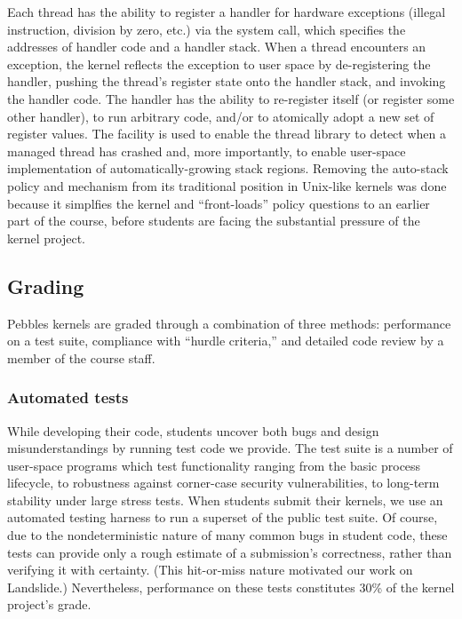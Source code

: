 Each thread has the ability to register a handler
for hardware exceptions (illegal instruction,
division by zero, etc.)
via the  system call,
which specifies the addresses of handler code
and a handler stack.
When a thread encounters an exception,
the kernel reflects the exception to user space
by
de-registering the handler,
pushing the thread's register state onto the handler stack,
and invoking the handler code.
The handler has the ability to re-register itself
(or register some other handler),
to run arbitrary code,
and/or to atomically adopt a new set of register
values.
The  facility is used to enable
the thread library to detect when a managed
thread has crashed
and, more importantly,
to enable user-space
implementation of automatically-growing stack
regions.
Removing the auto-stack policy and mechanism from
its traditional position in Unix-like kernels
was done because it simplfies the kernel and
``front-loads'' policy questions to an earlier
part of the course,
before students are facing the substantial pressure
of the kernel project.

\subsection{Grading}

Pebbles kernels are graded through a combination
of three methods:
performance on a test suite,
compliance with ``hurdle criteria,''
and detailed code review by a member of the course staff.

\subsubsection{Automated tests}

While developing their code, students uncover both bugs
and design misunderstandings by running test code we
provide.
The test suite is a number of user-space programs which test
functionality ranging from the basic process lifecycle, to robustness
against corner-case security vulnerabilities, to long-term stability
under large stress tests.
%
When students submit their kernels,
we use an automated testing harness to
run a superset of the public test suite.
%
Of course, due to the nondeterministic nature of many common bugs in student code,
these tests can provide only a rough estimate of a submission's correctness,
rather than verifying it with certainty.
(This hit-or-miss nature motivated our work on Landslide.)
Nevertheless, performance on these tests constitutes 30\% of the kernel project's grade.

